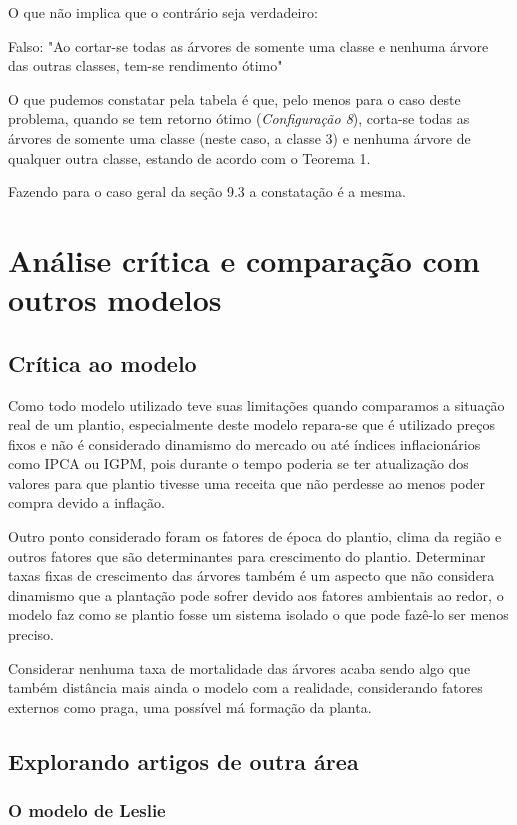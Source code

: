 \documentclass[a4paper, 12pt]{article}
\begin{document}
O que não implica que o contrário seja verdadeiro:

Falso: "Ao cortar-se todas as árvores de somente uma classe e nenhuma árvore das outras classes, tem-se rendimento ótimo"

O que pudemos constatar pela tabela é que, pelo menos para o caso deste problema, quando se tem retorno ótimo (\emph{Configuração 8}), corta-se todas as árvores de somente uma classe (neste caso, a classe 3) e nenhuma árvore de qualquer outra classe, estando de acordo com o Teorema 1.\newline

Fazendo para o caso geral da seção 9.3 a constatação é a mesma.

\section{Análise crítica e comparação com outros modelos}
\subsection{Crítica ao modelo}
Como todo modelo utilizado teve suas limitações quando comparamos a situação real de um plantio, especialmente deste modelo repara-se que é utilizado preços fixos e não é considerado dinamismo do mercado ou até índices inflacionários como IPCA ou IGPM, pois durante o tempo poderia se ter atualização dos valores para que plantio tivesse uma receita que não perdesse ao menos poder compra devido a inflação.

Outro ponto considerado foram os fatores de época do plantio, clima da região e outros fatores que são determinantes para crescimento do plantio. Determinar taxas fixas de crescimento das árvores também é um aspecto que não considera dinamismo que a plantação pode sofrer devido aos fatores ambientais ao redor, o modelo faz como se plantio fosse um sistema isolado o que pode fazê-lo ser menos preciso.

Considerar nenhuma taxa de mortalidade das árvores acaba sendo algo que também distância mais ainda o modelo com a realidade, considerando fatores externos como praga, uma possível má formação da planta.

\subsection{Explorando artigos de outra área}

\subsubsection{O modelo de Leslie}
\end{document}
